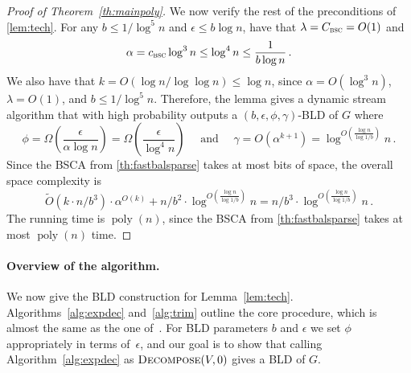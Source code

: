 \documentclass[epsfig,letter,11pt]{article}
\numberwithin{equation}{section}
\newcommand{\otil}{\tilde{O}}
\renewcommand{\tilde}{\widetilde}
\DeclareMathOperator*{\poly}{poly}
\DeclareMathOperator*{\sw}{\textsc{bsc}}
\begin{document}
\begin{proof}[Proof of Theorem~\ref{th:mainpoly}]
	We now verify the rest of the preconditions of \cref{lem:tech}. For any $b \le 1/\log^5 n$ and $\epsilon \le b \log n$, have that $\lambda=C_{\sw} = O(1)$ and
	\begin{equation*}
		\alpha=c_{\sw} \log^3 n \le \log^4 n \le \frac{1}{b \log n} \, .
	\end{equation*}
	We also have that $k = O(\log n /\log\log n) \le \log n$, since $\alpha = O(\log^3 n)$, $\lambda = O(1)$, and $b \le 1/\log^5 n$. Therefore, the lemma gives a dynamic stream algorithm that with high probability outputs a $(b, \epsilon, \phi, \gamma)$-BLD of $G$ where
	\begin{equation*}
		\phi = \Omega\left(\frac{\epsilon}{\alpha \log n}\right) = \Omega\left(\frac{\epsilon}{ \log^4 n}\right) \quad \text{ and } \quad \gamma = O(\alpha^{k+1})= \log^{O(\frac{\log n}{\log 1/b})}n \, .
	\end{equation*}
	Since the BSCA from \cref{th:fastbalsparse} takes at most  bits of space, the overall space complexity is
	\begin{equation*}
		\otil(k \cdot n/b^3) \cdot \alpha^{O(k)} + n/b^2\cdot \log^{O(\frac{\log n}{\log 1/b})}n = n/b^3\cdot \log^{O(\frac{\log n}{\log 1/b})}n \, .
	\end{equation*}
 The running time is $\poly(n)$, since  the BSCA from \cref{th:fastbalsparse} takes at most $\poly(n)$ time.
\end{proof}

\paragraph{Overview of the algorithm.} We now give the BLD construction for Lemma~\ref{lem:tech}. Algorithms~\ref{alg:expdec} and~\ref{alg:trim} outline the core procedure, which is almost the same as the one of~\cite{streamexpdec}. For BLD parameters $b$ and $\epsilon$ we set $\phi$ appropriately in terms of~$\epsilon$, and our goal is to show that calling Algorithm~\ref{alg:expdec} as $\textsc{Decompose}(V,0)$ gives a BLD of $G$.
\end{document}
